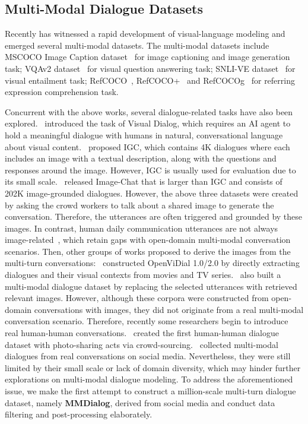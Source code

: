 \documentclass[11pt]{article}
\newcommand{\DataName}{MMDialog}
\begin{document}
\subsection{Multi-Modal Dialogue Datasets}
Recently has witnessed a rapid development of visual-language modeling and emerged several multi-modal datasets. The multi-modal datasets include MSCOCO Image Caption dataset~\cite{chen2015microsoft} for image captioning and image generation task; VQAv2 dataset~\cite{goyal2017making} for visual question answering task; SNLI-VE dataset~\cite{xie2019visual} for visual entailment task; RefCOCO~\cite{yu2016modeling}, RefCOCO+~\cite{yu2016modeling} and RefCOCOg~\cite{mao2016generation} for referring expression comprehension task.

Concurrent with the above works, several dialogue-related tasks have also been explored.~\citet{das2017visual} introduced the task of Visual Dialog, which requires an AI agent to hold a meaningful dialogue with humans in natural, conversational language about visual content.~\citet{mostafazadeh-etal-2017-image} proposed IGC, which contains 4K dialogues where each includes an image with a textual description, along with the questions and responses around the image. However, IGC is usually used for evaluation due to its small scale.~\citet{shuster-etal-2020-image} released Image-Chat that is larger than IGC and consists of 202K image-grounded dialogues. However, the above three datasets were created by asking the crowd workers to talk about a shared image to generate the conversation. Therefore, the utterances are often triggered and grounded by these images. In contrast, human daily communication utterances are not always image-related~\cite{zheng-etal-2022-mmchat}, which retain gaps with open-domain multi-modal conversation scenarios. Then, other groups of works proposed to derive the images from the multi-turn conversations:~\citet{meng2020openvidial,wang2021openvidial} constructed OpenViDial 1.0/2.0 by directly extracting dialogues and their visual contexts from movies and TV series.~\citet{lee-etal-2021-constructing} also built a multi-modal dialogue dataset by replacing the selected utterances with retrieved relevant images. However, although these corpora were constructed from open-domain conversations with images, they did not originate from a real multi-modal conversation scenario. Therefore, recently some researchers begin to introduce real human-human conversations.~\citet{zang-etal-2021-photochat} created the first human-human dialogue dataset with photo-sharing acts via crowd-sourcing.~\citet{zheng-etal-2022-mmchat} collected multi-modal dialogues from real conversations on social media. Nevertheless, they were still limited by their small scale or lack of domain diversity, which may hinder further explorations on multi-modal dialogue modeling. To address the aforementioned issue, we make the first attempt to construct a million-scale multi-turn dialogue dataset, namely \textbf{\DataName}, derived from social media and conduct data filtering and post-processing elaborately.
\end{document}
